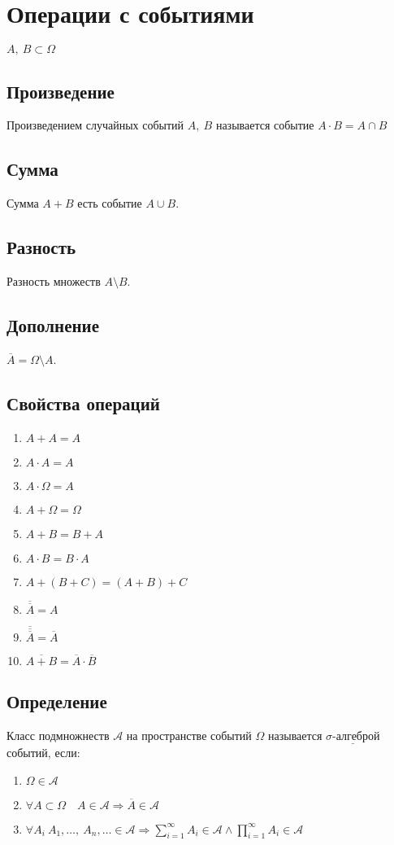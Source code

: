 \documentclass[12pt, a4paper]{article}
\begin{document}
    \section*{Операции с событиями}
    \begin{center}
        $A,\ B\subset \Omega$
    \end{center}
    \subsection*{Произведение}
        Произведением случайных событий $A,\ B$ называется событие $A\cdot B = A\cap B$
    \subsection*{Сумма}
        Сумма $A + B$ есть событие $A\cup B$.
    \subsection*{Разность}
        Разность множеств $A\setminus B$.
    \subsection*{Дополнение}
        $\overline{A} = \Omega\setminus A$.
    \subsection*{Свойства операций}
    \begin{enumerate}
        \item $A + A = A$
        \item $A\cdot A = A$
        \item $A\cdot \Omega = A$
        \item $A + \Omega = \Omega$
        \item $A + B = B + A$
        \item $A\cdot B = B\cdot A$
        \item $A + (B + C) = (A + B) + C$
        \item $\overline{\overline{A}} = A$
        \item $\overline{\overline{\overline{A}}} = \overline{A}$
        \item $\overline{A + B} = \overline{A}\cdot\overline{B}$
    \end{enumerate}

    \subsection*{Определение}
    Класс подмножнеств $\mathcal{A}$ на пространстве событий $\Omega$ называется 
   $\underline{\text{$\sigma$-алгеброй}}$ событий, если:
    \begin{enumerate}
        \item $\Omega\in \mathcal{A}$
        \item $\forall A\subset\Omega\quad A\in \mathcal{A}\Rightarrow \overline{A}\in\mathcal{A}$
        \item $\forall A_i\ A_1,\dots,\ A_n,\dots \in \mathcal{A}\Rightarrow \displaystyle\sum_{i = 1}^{\infty} A_i\in \mathcal{A} \wedge \prod_{i = 1}^{\infty} A_i\in \mathcal{A}$
    \end{enumerate}
\end{document}
